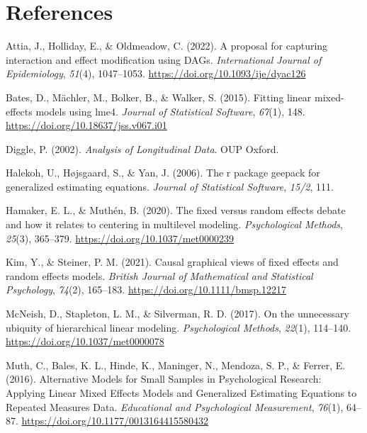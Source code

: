 \documentclass[
  12pt,
  a4paper,
]{article}
\newlength{\cslhangindent}
\newenvironment{CSLReferences}[2] %
 {\begin{list}{}{%
  \setlength{\itemindent}{0pt}
  \setlength{\leftmargin}{0pt}
  \setlength{\parsep}{0pt}
  \ifodd #1
   \setlength{\leftmargin}{\cslhangindent}
   \setlength{\itemindent}{-1\cslhangindent}
  \fi
  \setlength{\itemsep}{#2\baselineskip}}}
 {\end{list}}
\begin{document}
\newpage

\section{References}\label{references}

\label{refs}
\begin{CSLReferences}{1}{0}
Attia, J., Holliday, E., \& Oldmeadow, C. (2022). A proposal for
capturing interaction and effect modification using DAGs.
\emph{International Journal of Epidemiology}, \emph{51}(4), 1047--1053.
\url{https://doi.org/10.1093/ije/dyac126}

Bates, D., Mächler, M., Bolker, B., \& Walker, S. (2015). Fitting linear
mixed-effects models using {lme4}. \emph{Journal of Statistical
Software}, \emph{67}(1), 148.
\url{https://doi.org/10.18637/jss.v067.i01}

Diggle, P. (2002). \emph{Analysis of Longitudinal Data}. OUP Oxford.

Halekoh, U., Højsgaard, S., \& Yan, J. (2006). The r package geepack for
generalized estimating equations. \emph{Journal of Statistical
Software}, \emph{15/2}, 111.

Hamaker, E. L., \& Muthén, B. (2020). The fixed versus random effects
debate and how it relates to centering in multilevel modeling.
\emph{Psychological Methods}, \emph{25}(3), 365--379.
\url{https://doi.org/10.1037/met0000239}

Kim, Y., \& Steiner, P. M. (2021). Causal graphical views of fixed
effects and random effects models. \emph{British Journal of Mathematical
and Statistical Psychology}, \emph{74}(2), 165--183.
\url{https://doi.org/10.1111/bmsp.12217}

McNeish, D., Stapleton, L. M., \& Silverman, R. D. (2017). On the
unnecessary ubiquity of hierarchical linear modeling.
\emph{Psychological Methods}, \emph{22}(1), 114--140.
\url{https://doi.org/10.1037/met0000078}

Muth, C., Bales, K. L., Hinde, K., Maninger, N., Mendoza, S. P., \&
Ferrer, E. (2016). Alternative Models for Small Samples in Psychological
Research: Applying Linear Mixed Effects Models and Generalized
Estimating Equations to Repeated Measures Data. \emph{Educational and
Psychological Measurement}, \emph{76}(1), 64--87.
\url{https://doi.org/10.1177/0013164415580432}


\end{CSLReferences}
\end{document}

